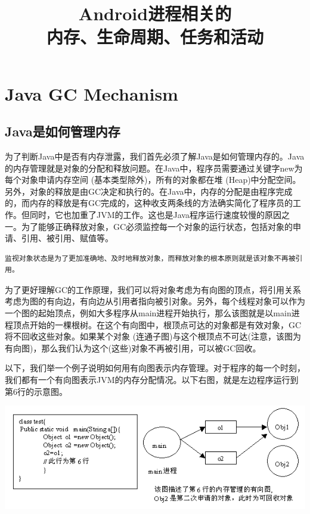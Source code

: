 \documentclass[a4paper, 11pt]{article}
\title{Android进程相关的\\[2pt]\normalsize 内存、生命周期、任务和活动}
\begin{document}
\maketitle
\tableofcontents
\section{Java GC Mechanism}
\subsection{Java是如何管理内存}
为了判断Java中是否有内存泄露，我们首先必须了解Java是如何管理内存的。Java的内存管理就是对象的分配和释放问题。在Java中，程序员需要通过关键字new为每个对象申请内存空间 (基本类型除外)，所有的对象都在堆 (Heap)中分配空间。另外，对象的释放是由GC决定和执行的。在Java中，内存的分配是由程序完成的，而内存的释放是有GC完成的，这种收支两条线的方法确实简化了程序员的工作。但同时，它也加重了JVM的工作。这也是Java程序运行速度较慢的原因之一。为了能够正确释放对象，GC必须监控每一个对象的运行状态，包括对象的申请、引用、被引用、赋值等。
\begin{verbatim}
监视对象状态是为了更加准确地、及时地释放对象，而释放对象的根本原则就是该对象不再被引用。
\end{verbatim}

为了更好理解GC的工作原理，我们可以将对象考虑为有向图的顶点，将引用关系考虑为图的有向边，有向边从引用者指向被引对象。另外，每个线程对象可以作为一个图的起始顶点，例如大多程序从main进程开始执行，那么该图就是以main进程顶点开始的一棵根树。在这个有向图中，根顶点可达的对象都是有效对象，GC将不回收这些对象。如果某个对象 (连通子图)与这个根顶点不可达(注意，该图为有向图)，那么我们认为这个(这些)对象不再被引用，可以被GC回收。

以下，我们举一个例子说明如何用有向图表示内存管理。对于程序的每一个时刻，我们都有一个有向图表示JVM的内存分配情况。以下右图，就是左边程序运行到第6行的示意图。

\begin{center}
\includegraphics[scale=0.6]{javaobjref.png}
\end{center}
\end{document}
